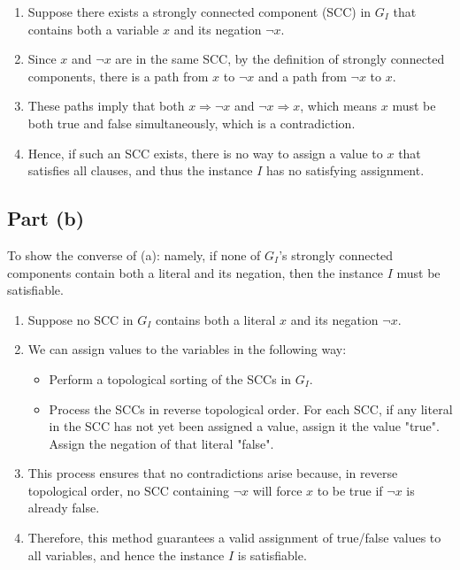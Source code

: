 \documentclass[11pt]{article}
\begin{document}
\begin{enumerate}
    \item Suppose there exists a strongly connected component (SCC) in \( G_I \) that contains both a variable \( x \) and its negation \( \neg x \).
    \item Since \( x \) and \( \neg x \) are in the same SCC, by the definition of strongly connected components, there is a path from \( x \) to \( \neg x \) and a path from \( \neg x \) to \( x \).
    \item These paths imply that both \( x \Rightarrow \neg x \) and \( \neg x \Rightarrow x \), which means \( x \) must be both true and false simultaneously, which is a contradiction.
    \item Hence, if such an SCC exists, there is no way to assign a value to \( x \) that satisfies all clauses, and thus the instance \( I \) has no satisfying assignment.
\end{enumerate}

\subsection*{Part (b)}
To show the converse of (a): namely, if none of \( G_I \)'s strongly connected components contain both a literal and its negation, then the instance \( I \) must be satisfiable.


\begin{enumerate}
    \item Suppose no SCC in \( G_I \) contains both a literal \( x \) and its negation \( \neg x \).
    \item We can assign values to the variables in the following way: 
    \begin{itemize}
        \item Perform a topological sorting of the SCCs in \( G_I \).
        \item Process the SCCs in reverse topological order. For each SCC, if any literal in the SCC has not yet been assigned a value, assign it the value "true". Assign the negation of that literal "false".
    \end{itemize}
    \item This process ensures that no contradictions arise because, in reverse topological order, no SCC containing \( \neg x \) will force \( x \) to be true if \( \neg x \) is already false.
    \item Therefore, this method guarantees a valid assignment of true/false values to all variables, and hence the instance \( I \) is satisfiable.
\end{enumerate}
\end{document}
